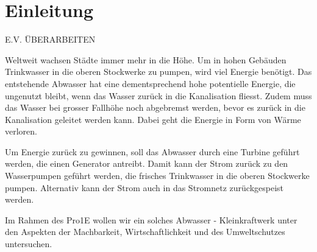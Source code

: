 \section{Einleitung}


E.V. ÜBERARBEITEN

Weltweit wachsen Städte immer mehr in die Höhe. Um in hohen Gebäuden Trinkwasser in die oberen Stockwerke zu pumpen, wird viel Energie benötigt. Das entstehende Abwasser hat eine dementsprechend hohe potentielle Energie, die ungenutzt bleibt, wenn das Wasser zurück in die Kanalisation fliesst. Zudem muss das Wasser bei grosser Fallhöhe noch abgebremst werden, bevor es zurück in die Kanalisation geleitet werden kann. Dabei geht die Energie in Form von Wärme verloren. 

Um Energie zurück zu gewinnen, soll das Abwasser durch eine Turbine geführt werden, die einen Generator antreibt. Damit kann der Strom zurück zu den Wasserpumpen geführt werden, die frisches Trinkwasser in die oberen Stockwerke pumpen. Alternativ kann der Strom auch in das Stromnetz zurückgespeist werden. 

Im Rahmen des Pro1E wollen wir ein solches Abwasser - Kleinkraftwerk unter den Aspekten der Machbarkeit, Wirtschaftlichkeit und des Umweltschutzes untersuchen.  



